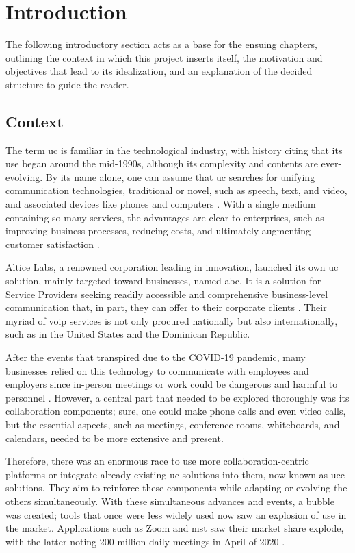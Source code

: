 \chapter{Introduction}

The following introductory section acts as a base for the ensuing chapters, outlining the context in which this project inserts itself, the motivation and objectives that lead to its idealization, and an explanation of the decided structure to guide the reader.  

\section{Context}

The term \gls{uc} is familiar in the technological industry, with history citing that its use began around the mid-1990s, although its complexity and contents are ever-evolving. By its name alone, one can assume that \gls{uc} searches for unifying communication technologies, traditional or novel, such as speech, text, and video, and associated devices like phones and computers \citep{Riemer2009}. With a single medium containing so many services, the advantages are clear to enterprises, such as improving business processes, reducing costs, and ultimately augmenting customer satisfaction \citep{Jiafeng2012}.

Altice Labs, a renowned corporation leading in innovation, launched its own \gls{uc} solution, mainly targeted toward businesses, named \gls{abc}. It is a solution for Service Providers seeking readily accessible and comprehensive business-level communication that, in part, they can offer to their corporate clients \citep{alticelabsUnifiedCommunications}. Their myriad of \gls{voip} services is not only procured nationally but also internationally, such as in the United States and the Dominican Republic.

After the events that transpired due to the COVID-19 pandemic, many businesses relied on this technology to communicate with employees and employers since in-person meetings or work could be dangerous and harmful to personnel \citep{10.1145/3498335}. However, a central part that needed to be explored thoroughly was its collaboration components; sure, one could make phone calls and even video calls, but the essential aspects, such as meetings, conference rooms, whiteboards, and calendars, needed to be more extensive and present.

Therefore, there was an enormous race to use more collaboration-centric platforms or integrate already existing \gls{uc} solutions into them, now known as \gls{ucc} solutions. They aim to reinforce these components while adapting or evolving the others simultaneously. With these simultaneous advances and events, a bubble was created; tools that once were less widely used now saw an explosion of use in the market. Applications such as Zoom and \gls{mst} saw their market share explode, with the latter noting 200 million daily meetings in April of 2020 \citep{10.1145/3498335}.

